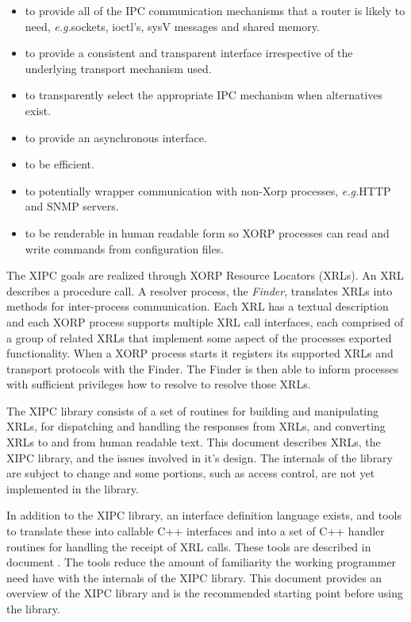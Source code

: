 \documentclass[11pt]{article}
\newcommand{\eg}{\emph{e.g.\/}} %
\begin{document}
\begin{itemize}

\item to provide all of the IPC communication mechanisms that a router is
likely to need, \eg sockets, ioctl's, sysV messages and shared memory.

\item to provide a consistent and transparent interface irrespective
of the underlying transport mechanism used.

\item to transparently select the appropriate IPC mechanism when
alternatives exist.

\item to provide an asynchronous interface.

\item to be efficient.

\item to potentially wrapper communication with non-Xorp processes,
\eg HTTP and SNMP servers.

\item to be renderable in human readable form so XORP processes can
read and write commands from configuration files.

\end{itemize}

The XIPC goals are realized through XORP Resource Locators (XRLs).  An
XRL describes a procedure call.  A resolver process, the
\emph{Finder}, translates XRLs into methods for inter-process
communication.  Each XRL has a textual description and each XORP
process supports multiple XRL call interfaces, each comprised of a
group of related XRLs that implement some aspect of the processes
exported functionality.  When a XORP process starts it registers its
supported XRLs and transport protocols with the Finder.  The Finder is
then able to inform processes with sufficient privileges how to
resolve to resolve those XRLs.

The XIPC library consists of a set of routines for building and
manipulating XRLs, for dispatching and handling the responses from
XRLs, and converting XRLs to and from human readable text.  This
document describes XRLs, the XIPC library, and the issues involved in
it's design.  The internals of the library are subject to change and
some portions, such as access control, are not yet implemented in the
library.

In addition to the XIPC library, an interface definition language
exists, and tools to translate these into callable C++ interfaces and
into a set of C++ handler routines for handling the receipt of XRL
calls.  These tools are described in document \cite{xorp:xrl_interfaces}.
The tools reduce 
the amount of familiarity the working programmer need have with the
internals of the XIPC library.  This document provides an overview of
the XIPC library and is the recommended starting point before using
the library.
\end{document}
